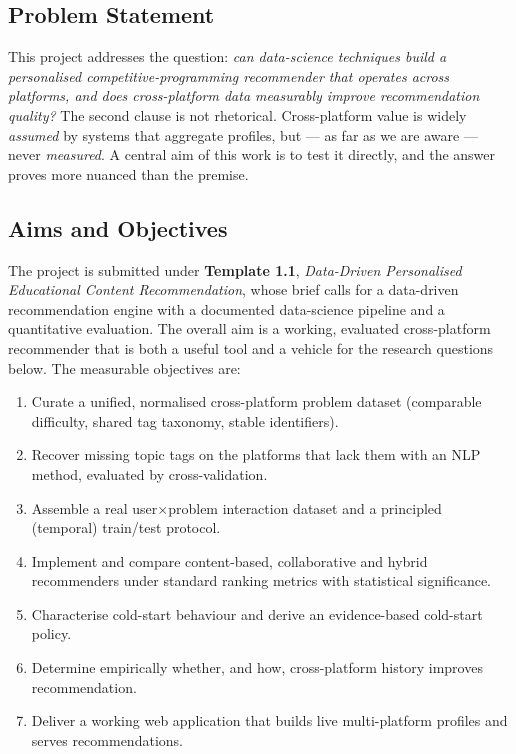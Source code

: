\documentclass[12pt,a4paper]{article}
\begin{document}
\subsection{Problem Statement}
This project addresses the question: \emph{can data-science techniques build a
personalised competitive-programming recommender that operates across platforms, and
does cross-platform data measurably improve recommendation quality?} The second clause
is not rhetorical. Cross-platform value is widely \emph{assumed} by systems that
aggregate profiles, but --- as far as we are aware --- never \emph{measured}. A central
aim of this work is to test it directly, and the answer proves more nuanced than the
premise.

\subsection{Aims and Objectives}
\label{sec:objectives}
The project is submitted under \textbf{Template 1.1}, \emph{Data-Driven Personalised
Educational Content Recommendation}, whose brief calls for a data-driven recommendation
engine with a documented data-science pipeline and a quantitative evaluation. The overall
aim is a working, evaluated cross-platform recommender that is both a useful tool and a
vehicle for the research questions below. The measurable objectives are:
\begin{enumerate}
    \item[\textbf{O1}] Curate a unified, normalised cross-platform problem dataset
    (comparable difficulty, shared tag taxonomy, stable identifiers).
    \item[\textbf{O2}] Recover missing topic tags on the platforms that lack them with an
    NLP method, evaluated by cross-validation.
    \item[\textbf{O3}] Assemble a real user$\times$problem interaction dataset and a
    principled (temporal) train/test protocol.
    \item[\textbf{O4}] Implement and compare content-based, collaborative and hybrid
    recommenders under standard ranking metrics with statistical significance.
    \item[\textbf{O5}] Characterise cold-start behaviour and derive an evidence-based
    cold-start policy.
    \item[\textbf{O6}] Determine empirically whether, and how, cross-platform history
    improves recommendation.
    \item[\textbf{O7}] Deliver a working web application that builds live
    multi-platform profiles and serves recommendations.
\end{enumerate}
\end{document}
